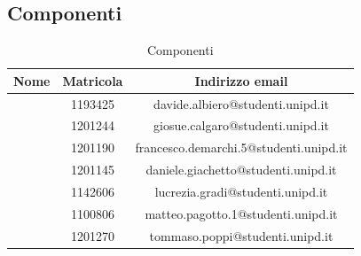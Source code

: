 \subsection{Componenti}

\renewcommand{\arraystretch}{1}
	\begin{table}[H]
		\begin{center}
			\setlength{\aboverulesep}{0pt}
			\setlength{\belowrulesep}{0pt}
			\setlength{\extrarowheight}{.75ex}
			\begin{tabular}{ c c c }
				\rowcolor{AzzurroGruppo!30} 
				\textbf{Nome} & \textbf{Matricola} & \textbf{Indirizzo email}\\
				\toprule
				
				\Davide{} & 1193425 & davide.albiero@studenti.unipd.it \\
				\Giosue{} & 1201244 & giosue.calgaro@studenti.unipd.it \\
				\Francesco{} & 1201190 & francesco.demarchi.5@studenti.unipd.it \\
				\Daniele{} & 1201145 & daniele.giachetto@studenti.unipd.it \\
				\Lucrezia{} & 1142606 & lucrezia.gradi@studenti.unipd.it \\
				\Matteo{} & 1100806 & matteo.pagotto.1@studenti.unipd.it \\
				\Tommaso{} & 1201270 & tommaso.poppi@studenti.unipd.it \\
				
				\bottomrule
			\end{tabular}
			\caption{Componenti}
		\end{center}
    \end{table}
